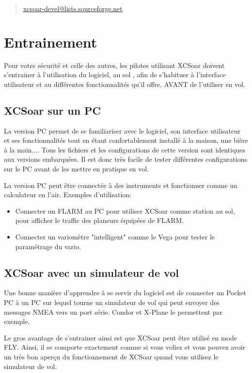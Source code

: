 \begin{quote}
\href{mailto:xcsoar-devel@lists.sourceforge.net}{xcsoar-devel@lists.sourceforge.net}
\end{quote}

\section{Entrainement}
Pour votre sécurité et celle des autres, les pilotes utilisant XCSoar doivent s'entrainer à l'utilisation du logiciel, au sol , afin de s'habituer à l'interface utilisateur et au différentes fonctionnalités qu'il offre, AVANT de l'utiliser en vol.

\subsection*{XCSoar sur un PC}
La version PC permet de se familiariser avec le logiciel, son interface utilisateur et ses fonctionnalités tout en étant confortablement installé à la maison, une bière à la main.... Tous les fichiers et les configurations de cette version sont identiques aux versions embarquées. Il est donc très facile de tester différentes configurations sur le PC avant de les mettre en pratique en vol.

La version PC peut être connectée à des instruments et fonctionner comme un calculateur en l'air. Exemples d'utilisation:

\begin{itemize}
\item Connecter un FLARM au PC pour utiliser XCSoar comme station au sol, pour afficher le traffic des planeurs équipées de FLARM.
\item Connecter un variomètre "intelligent"  comme le Vega pour tester le paramétrage du vario.
\end{itemize}

\subsection*{XCSoar avec un simulateur de vol}
Une bonne manière d'apprendre à se servir du logiciel est de connecter un Pocket PC à un PC sur lequel tourne un simulateur de vol qui peut envoyer des messages NMEA vers un port série. Condor et X-Plane le permettent par exemple.

Le gros avantage de s'entrainer ainsi est que XCSoar peut être utilisé en mode FLY. Ainsi, il se comporte exactement comme si vous voliez et vous pouvez avoir un très bon aperçu du fonctionnement de XCSoar quand vous utilisez le simulateur de vol.


